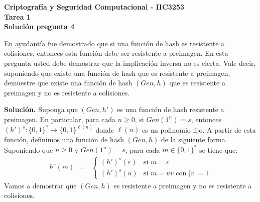 \documentclass[11pt]{article}
\newcommand{\Gen}{\textit{Gen}}
\begin{document}
\begin{center}
  \bf Criptografía y Seguridad Computacional - IIC3253\\
  \bf Tarea 1\\
  \bf Solución pregunta 4
\end{center}


\bigskip

\noindent
En ayudantía fue demostrado que si una función de hash es resistente a
colisiones, entonces esta función debe ser resistente a preimagen. En
esta pregunta usted debe demostrar que la implicación inversa no es
cierta. Vale decir, suponiendo que existe una función de hash que es
resistente a preimagen, demuestre que existe una función de hash
$(\Gen, h)$ que es resistente a preimagen y no es resistente
a colisiones.


\bigskip

\noindent
{\bf Solución.}  Suponga que $(\Gen, h')$ es una función de hash
resistente a preimagen. En particular, para cada $n \geq 0$, si
$\Gen(1^n) = s$, entonces $(h')^s : \{0,1\}^* \to \{0,1\}^{\ell(n)}$
donde $\ell(n)$ es un polinomio fijo. A partir de esta función,
definimos una función de hash $(\Gen, h)$ de la siguiente
forma. Suponiendo que $n \geq 0$ y $\Gen(1^n) = s$, para cada $m \in
\{0,1\}^*$ se tiene que:
\begin{eqnarray*}
h^s(m) &=&
\begin{cases}
  (h')^s(\varepsilon) & \text{si } m = \varepsilon\\
  (h')^s(u) & \text{si } m = uv \text{ con } |v| = 1
\end{cases}
\end{eqnarray*}
Vamos a demostrar que $(\Gen, h)$ es resistente a preimagen y no es
resistente a colisiones.
\end{document}
